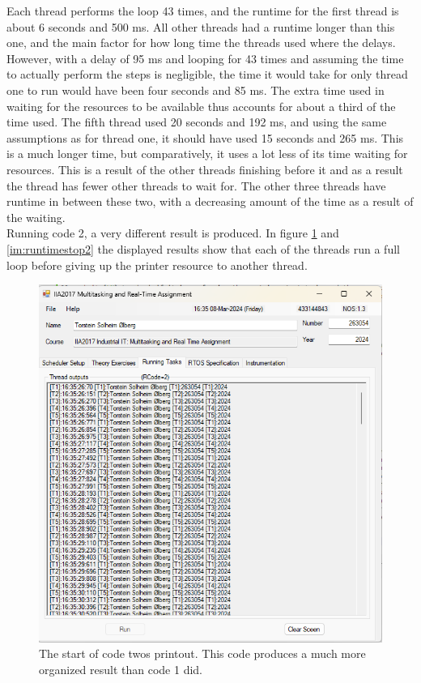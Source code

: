 \documentclass[12pt, A4paper, english]{book}
\begin{document}
Each thread performs the loop 43 times, and the runtime for the first thread is about 6 seconds and 500 ms. All other threads had a runtime longer than this one, and the main factor for how long time the threads used where the delays. However, with a delay of 95 ms and looping for 43 times and assuming the time to actually perform the steps is negligible, the time it would take for only thread one to run would have been four seconds and 85 ms. The extra time used in waiting for the resources to be available thus accounts for about a third of the time used. The fifth thread used 20 seconds and 192 ms, and using the same assumptions as for thread one, it should have used 15 seconds and 265 ms. This is a much longer time, but comparatively, it uses a lot less of its time waiting for resources. This is a result of the other threads finishing before it and as a result the thread has fewer other threads to wait for. The other three threads have runtime in between these two, with a decreasing amount of the time as a result of the waiting. \\
Running code 2, a very different result is produced. In figure \ref{im:runtimestart2} and \ref{im:runtimestop2} the displayed results show that each of the threads run a full loop before giving up the printer resource to another thread. 
				\begin{figure}
\includegraphics[width=\linewidth]{Runtime_start2}
\caption{The start of code twos printout. This code produces a much more organized result than code 1 did.}
\label{im:runtimestart2}
				\end{figure}
\end{document}
